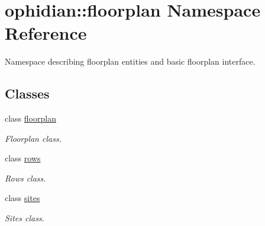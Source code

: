 \hypertarget{namespaceophidian_1_1floorplan}{\section{ophidian\-:\-:floorplan Namespace Reference}
\label{namespaceophidian_1_1floorplan}
}


Namespace describing floorplan entities and basic floorplan interface.  


\subsection*{Classes}
\begin{DoxyCompactItemize}
\item 
class \hyperlink{classophidian_1_1floorplan_1_1floorplan}{floorplan}
\begin{DoxyCompactList}\small\item\em Floorplan class. \end{DoxyCompactList}\item 
class \hyperlink{classophidian_1_1floorplan_1_1rows}{rows}
\begin{DoxyCompactList}\small\item\em Rows class. \end{DoxyCompactList}\item 
class \hyperlink{classophidian_1_1floorplan_1_1sites}{sites}
\begin{DoxyCompactList}\small\item\em Sites class. \end{DoxyCompactList}\end{DoxyCompactItemize}
